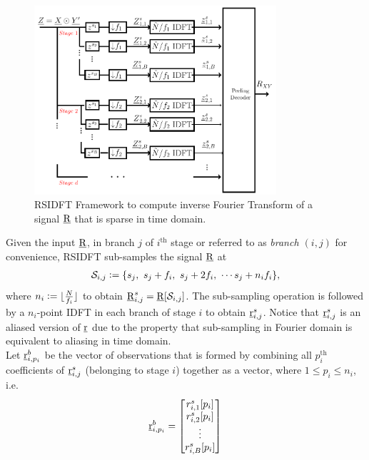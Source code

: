 \begin{enumerate}
	 \begin{figure}[h!]
	 	\begin{center}
	 		\includegraphics[height=7cm]{Figures/FFAST_Robust} 
	 	\end{center}	   
	 	\caption{ RSIDFT Framework to compute inverse Fourier Transform of a signal $\underline{\mathrm{R}}$ that is sparse in time domain. }\label{fig:rsidft}
	\vspace{5 pt}
	 \end{figure}
	 	
	 Given the input $\underline{\mathrm{R}}$, in branch $j$ of $i^{\text{th}}$ stage or referred to as \textit{branch $(i,j)$} for convenience, RSIDFT sub-samples the signal $\underline{\mathrm{R}}$ at
\begin{align*}
	 \mathcal{S}_{i,j} \mathrel{\mathop:}= \{s_j,\ s_j + f_i,\ s_j + 2f_i,\ \cdots s_j + n_i f_i\},
\end{align*}
where $n_i\mathrel{\mathop:}= \lfloor{\frac{N}{f_i} }\rfloor$ to obtain $\underline{\mathrm{R}}^{s}_{i,j}=\underline{\mathrm{R}}[\mathcal{S}_{i,j}]$. The sub-sampling operation is followed by a $n_i$-point IDFT in each branch of stage $i$ to obtain $ \underline{\mathrm{r}}^{s}_{i,j}$. Notice that $ \underline{\mathrm{r}}^{s}_{i,j}$ is an aliased version of $\underline{\mathrm{r}}$ due to the property that sub-sampling in Fourier domain is equivalent to aliasing in time domain.\\

	 Let $\underline{\mathrm{r}}^{b}_{i,p_i}$ be the  vector of observations that is formed by combining all $p_i^{\text{th}}$ coefficients of $\underline{\mathrm{r}}^{s}_{i,j}$ (belonging to stage $i$) together as a vector, where $1 \leq p_i \leq n_i$, i.e.
\[
	  \underline{\mathrm{r}}^{b}_{i,p_i} = \begin{bmatrix}
	 r^{s}_{i,1}[p_i] \\
	 r^{s}_{i,2}[p_i] \\
	 \vdots\\
	 r^{s}_{i,B}[p_i]
	 \end{bmatrix}  
\]


\end{enumerate}
